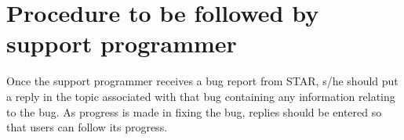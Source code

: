 \section{Procedure to be followed by support programmer}
Once the support programmer receives a bug report from STAR, s/he should put a
reply in the topic associated with that bug containing any information relating
to the bug. As progress is made in fixing the bug, replies should be entered
so that users can follow its progress. 

                                                                                                                                                                                                                     